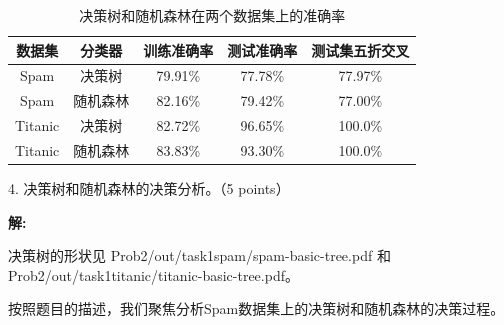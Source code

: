 \documentclass[8pt]{article}
\begin{document}
\begin{table}[H]
    \centering
    \caption{决策树和随机森林在两个数据集上的准确率}
    \label{tab:accuracy}
    \begin{tabular}{c|c|c|c|c}
        \toprule
        数据集 & 分类器 & 训练准确率 & 测试准确率 & 测试集五折交叉\\
        \midrule
        Spam & 决策树 & 79.91\% & 77.78\% & 77.97\% \\
        Spam & 随机森林 & 82.16\% & 79.42\% & 77.00\% \\
        Titanic & 决策树 & 82.72\% & 96.65\% & 100.0\% \\
        Titanic & 随机森林 & 83.83\% & 93.30\% & 100.0\% \\
        \bottomrule
    \end{tabular}
\end{table}

\vspace{3em}

4. 决策树和随机森林的决策分析。（5 points）

\textbf{\large 解:}

决策树的形状见{\color{blue} Prob2/out/task1spam/spam-basic-tree.pdf} 和 {\color{blue} Prob2/out/task1titanic/titanic-basic-tree.pdf}。

按照题目的描述，我们聚焦分析Spam数据集上的决策树和随机森林的决策过程。
\end{document}
